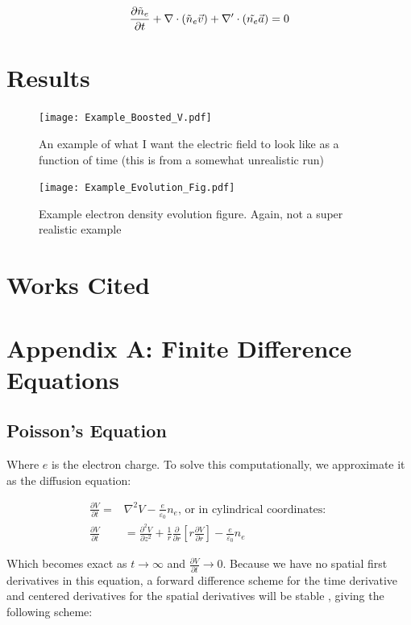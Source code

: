 \documentclass[11pt]{article}
\begin{document}
\begin{equation}
    \frac{\partial \Tilde{n}_e}{\partial t} + \nabla \cdot (\Tilde{n}_e \vec{v}) + \nabla' \cdot (\Tilde{n_e}\vec{a}) = 0
\end{equation}




\section{Results}

\begin{figure}
    \centering
    \texttt{[image: Example\_Boosted\_V.pdf]}
    \caption{An example of what I want the electric field to look like as a function of time (this is from a somewhat unrealistic run)}
    \label{fig:boosted}
\end{figure}

\begin{figure}
    \centering
    \texttt{[image: Example\_Evolution\_Fig.pdf]}
    \caption{Example electron density evolution figure. Again, not a super realistic example}
    \label{fig:evolution}
\end{figure}

\section{Works Cited}

\section{Appendix A: Finite Difference Equations}
\subsection{Poisson's Equation}
Where $e$ is the electron charge. To solve this computationally, we approximate it as the diffusion equation:

\begin{align}
    \frac{\partial{V}}{\partial{t}} = & \nabla^2 V - \frac{e}{\varepsilon_0} n_e \text{, or in cylindrical coordinates: } \\
    \frac{\partial{V}}{\partial{t}} & = \frac{\partial^2{V}}{\partial{z}^2} + \frac{1}{r}\frac{\partial}{\partial{r}}\left[ r \frac{\partial{V}}{\partial r}\right] - \frac{e}{\varepsilon_0}n_e
\end{align}

Which becomes exact as $t \to \infty$ and $\frac{\partial{V}}{\partial{t}} \to 0$. Because we have no spatial first derivatives in this equation, a forward difference scheme for the time derivative and centered derivatives for the spatial derivatives will be stable \cite{numerical}, giving the following scheme:
\end{document}
